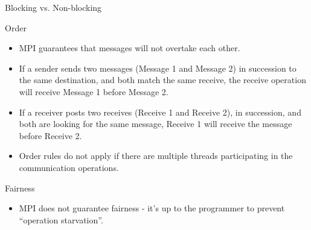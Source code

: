 \documentclass[9pt,c]{beamer}
\begin{document}
\begin{frame}[allowframebreaks]{Blocking vs. Non-blocking}
  \begin{block}{Order}
    \begin{itemize}
      \item MPI guarantees that messages will not overtake each other.
      \item If a sender sends two messages (Message 1 and Message 2) in succession to the same destination, and both match the same receive, the receive operation will receive Message 1 before Message 2.
      \item If a receiver posts two receives (Receive 1 and Receive 2), in succession, and both are looking for the same message, Receive 1 will receive the message before Receive 2.
      \item Order rules do not apply if there are multiple threads participating in the communication operations.
    \end{itemize}
  \end{block}
  \begin{block}{Fairness}
    \begin{itemize}
      \item MPI does not guarantee fairness - it’s up to the programmer to prevent “operation starvation”.
    \end{itemize}
  \end{block}
\end{frame}
\end{document}
